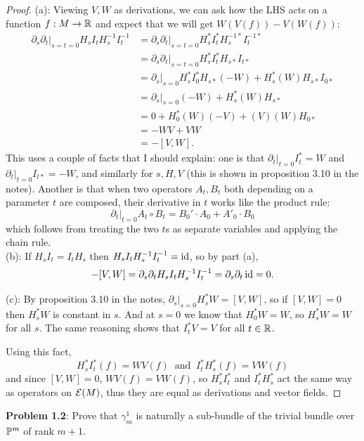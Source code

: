 \documentclass{amsart}
\begin{document}
\begin{proof}
	(a): Viewing $V,W$ as derivations, we can ask how the LHS acts on a function $f:M\to \R$ and expect that we will get $W(V(f))-V(W(f))$:
	\begin{align*}
		\partial_s\partial_t \big|_{s=t=0} H_sI_tH_s^{-1}I_t^{-1} &= \partial_s\partial_t \big|_{s=t=0} H_s^*I_t^*H_s^{-1*}I_t^{-1*}\\
		&= \partial_s\partial_t \big|_{s=t=0} H_s^*I_t^*H_{s*}I_{t*}\\
		&=  \partial_s\big|_{s=0} H_s^*I_0^*H_{s*} (-W) + H_s^*(W)H_{s*}I_{0*}\\
		&= \partial_s\big|_{s=0} (-W) + H_s^*(W)H_{s*}\\
		&= 0 + H_0^*(W)(-V) + (V)(W)H_{0*}\\
		&= -WV + VW\\
		&= -[V,W].
	\end{align*}
	This uses a couple of facts that I should explain: one is that $\partial_t|_{t=0} I_t^*=W$ and $\partial_t|_{t=0}I_{t*}=-W$, and similarly for $s,H,V$ (this is shown in proposition 3.10 in the notes). Another is that when two operators $A_t,B_t$ both depending on a parameter $t$ are composed, their derivative in $t$ works like the product rule:
	$$
	\partial_t|_{t=0} A_t\circ B_t = B_0'\cdot A_0 + A'_0\cdot B_0
	$$
	which follows from treating the two $t$s as separate variables and applying the chain rule.\\
	
	(b): If $H_sI_t=I_tH_s$ then $H_sI_tH_s^{-1}I_t^{-1}=\id$, so by part (a), 
	$$-[V,W] = \partial_s\partial_t H_sI_tH_s^{-1}I_t^{-1} = \partial_s\partial_t \id = 0.$$
	
	(c): By proposition 3.10 in the notes, $\partial_s|_{s=0} H_s^*W = [V,W]$, so if $[V,W]=0$ then $H_s^*W$ is constant in $s$. And at $s=0$ we know that $H_0^*W=W$, so $H_s^*W=W$ for all $s$. The same reasoning shows that $I_t^*V=V$ for all $t\in \R$.
	
	Using this fact, 
	$$H_s^*I_t^*(f) = WV(f) \;\; \text{and} \;\; I_t^*H_s^*(f)=VW(f)$$ and since $[V,W]=0$, $WV(f)=VW(f)$, so $H_s^*I_t^*$ and $I_t^*H_s^*$ act the same way as operators on $\EE(M)$, thus they are equal as derivations and vector fields.
	
\end{proof}

\newpage 

\textbf{Problem 1.2}: Prove that $\gamma_m^1$ is naturally a sub-bundle of the trivial bundle over $\P^m$ of rank $m+1$.
\end{document}
